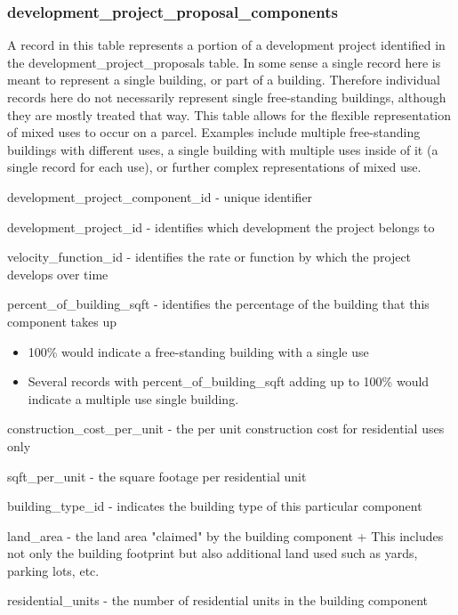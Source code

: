 \subsubsection{development\_project\_proposal\_components} 

A record in this table represents a portion of a development project identified in the development\_project\_proposals table. In some sense a single record here is meant to represent a single building, or part of a building. Therefore individual records here do not necessarily represent single free-standing buildings, although they are mostly treated that way. This table allows for the flexible representation of mixed uses to occur on a parcel. Examples include multiple free-standing buildings with different uses, a single building with multiple uses inside of it (a single record for each use), or further complex representations of mixed use.

\begin{description}
\item development\_project\_component\_id - unique identifier
\item development\_project\_id - identifies which development the project belongs to
\item velocity\_function\_id - identifies the rate or function by which the project develops over time
\item percent\_of\_building\_sqft - identifies the percentage of the building that this component takes up
  \begin{itemize}
  \item 100\% would indicate a free-standing building with a single use
  \item Several records with percent\_of\_building\_sqft adding up to 100\% would indicate a multiple use single building. 
  \end{itemize}
\item construction\_cost\_per\_unit - the per unit construction cost for residential uses only
\item sqft\_per\_unit - the square footage per residential unit
\item building\_type\_id - indicates the building type of this particular component
\item land\_area - the land area "claimed" by the building component
                + This includes not only the building footprint but also additional land used such as yards, parking lots, etc. 
\item residential\_units - the number of residential units in the building component 
\end{description}

